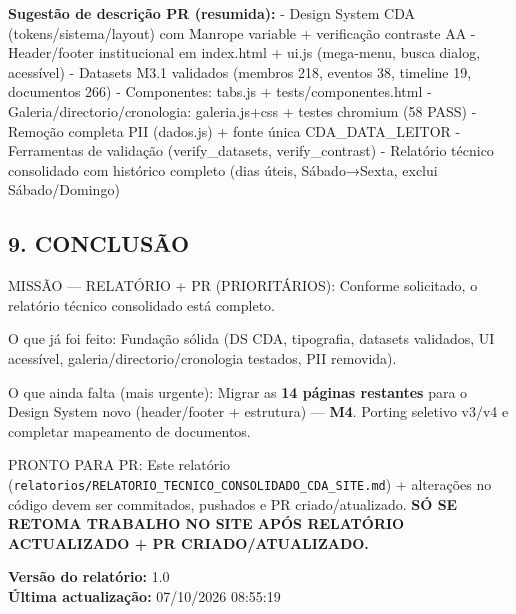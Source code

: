 \textbf{Sugestão de descrição PR (resumida):} - Design System CDA
(tokens/sistema/layout) com Manrope variable + verificação contraste AA
- Header/footer institucional em index.html + ui.js (mega-menu, busca
dialog, acessível) - Datasets M3.1 validados (membros 218, eventos 38,
timeline 19, documentos 266) - Componentes: tabs.js +
tests/componentes.html - Galeria/directorio/cronologia: galeria.js+css +
testes chromium (58 PASS) - Remoção completa PII (dados.js) + fonte
única CDA\_DATA\_LEITOR - Ferramentas de validação (verify\_datasets,
verify\_contrast) - Relatório técnico consolidado com histórico completo
(dias úteis, Sábado→Sexta, exclui Sábado/Domingo)

\subsection{9. CONCLUSÃO}\label{conclusuxe3o}

MISSÃO --- RELATÓRIO + PR (PRIORITÁRIOS): Conforme solicitado, o
relatório técnico consolidado está completo.

O que já foi feito: Fundação sólida (DS CDA, tipografia, datasets
validados, UI acessível, galeria/directorio/cronologia testados, PII
removida).

O que ainda falta (mais urgente): Migrar as \textbf{14 páginas
restantes} para o Design System novo (header/footer + estrutura) ---
\textbf{M4}. Porting seletivo v3/v4 e completar mapeamento de
documentos.

PRONTO PARA PR: Este relatório
(\texttt{relatorios/RELATORIO\_TECNICO\_CONSOLIDADO\_CDA\_SITE.md}) +
alterações no código devem ser commitados, pushados e PR
criado/atualizado. \textbf{SÓ SE RETOMA TRABALHO NO SITE APÓS RELATÓRIO
ACTUALIZADO + PR CRIADO/ATUALIZADO.}

\textbf{Versão do relatório:} 1.0\\
\textbf{Última actualização:} 07/10/2026 08:55:19
